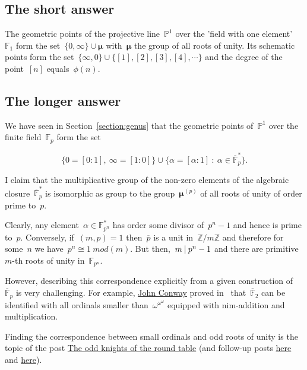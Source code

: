 \label{section:what-is-p1}
\subsection{The short answer}
The geometric points of the projective line~$\mathbb{P}^1$ over the 'field with one element'~$\mathbb{F}_1$ form the set~$\{ 0,\infty \} \cup \pmb{\mu}$ with~$\pmb{\mu}$ the group of all roots of unity. Its schematic points form the set~$\{ \infty,0 \} \cup \{ [1],[2],[3],[4],\cdots \}$ and the degree of the point~$[n]$ equals~$\phi(n)$.

\subsection{The longer answer}
We have seen in Section~\ref{section:genus} that the geometric points of~$\mathbb{P}^1$ over the finite field~$\mathbb{F}_p$ form the set

\begin{equation}
  \{ 0 = [0:1],~\infty=[1:0] \} \cup \{ \alpha = [\alpha:1]~:~\alpha \in \overline{\mathbb{F}}_p^{\ast} \}.
\end{equation}

I claim that the multiplicative group of the non-zero elements of the algebraic closure~$\overline{\mathbb{F}}_p^{\ast}$ is isomorphic as group to the group~$\pmb{\mu}^{(p)}$ of all roots of unity of order prime to~$p$.

Clearly, any element~$\alpha \in \mathbb{F}^{\ast}_{p^n}$   has order some divisor of~$p^n-1$ and hence is prime to~$p$. Conversely, if~$(m,p)=1$ then~$\overline{p}$ is a unit in~$\mathbb{Z}/m\mathbb{Z}$ and therefore for some~$n$ we have~$p^n \cong 1~mod(m)$. But then,~$m\mathbin{|} p^n-1$ and there are primitive~$m$-th roots of unity in~$\mathbb{F}_{p^n}$.

However, describing this correspondence explicitly from a given construction of~$\overline{\mathbb{F}}_p$ is very challenging. For example, \href{http://en.wikipedia.org/wiki/John_Horton_Conway}{John Conway} proved in~\cite{on-numbers-and-games} that~$\overline{\mathbb{F}}_2$ can be identified with all ordinals smaller than~$\omega^{\omega^{\omega}}$ equipped with nim-addition and multiplication.

Finding the correspondence between small ordinals and odd roots of unity is the topic of the post \href{http://www.neverendingbooks.org/index.php/the-odd-knights-of-the-round-table.html}{The odd knights of the round table} (and follow-up posts \href{http://www.neverendingbooks.org/index.php/seating-the-first-few-thousand-knights.html}{here} and \href{http://www.neverendingbooks.org/index.php/seating-the-first-few-billion-knights.html}{here}).

